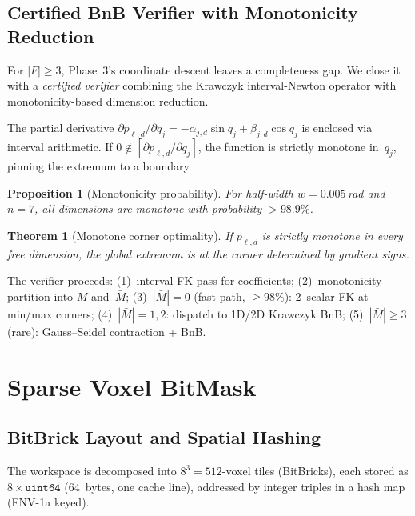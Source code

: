 \documentclass[journal]{IEEEtran}
\newtheorem{theorem}{Theorem}
\newtheorem{proposition}{Proposition}
\begin{document}
\subsection{Certified BnB Verifier with Monotonicity Reduction}%
\label{sec:certified_verifier}

For $|F|\geq 3$, Phase~3's coordinate descent leaves a completeness gap.
We close it with a \emph{certified verifier} combining the Krawczyk
interval-Newton operator with monotonicity-based dimension reduction.

The partial derivative
$\partial p_{\ell,d}/\partial q_j = -\alpha_{j,d}\sin q_j + \beta_{j,d}\cos q_j$
is enclosed via interval arithmetic.
If $0 \notin [\partial p_{\ell,d}/\partial q_j]$, the function is
strictly monotone in~$q_j$, pinning the extremum to a boundary.

\begin{proposition}[Monotonicity probability]\label{prop:mono_prob}
For half-width $w = 0.005\,$rad and $n = 7$, all dimensions are
monotone with probability $> 98.9\%$.
\end{proposition}

\begin{theorem}[Monotone corner optimality]\label{thm:mono_corner}
If $p_{\ell,d}$ is strictly monotone in every free dimension, the
global extremum is at the corner determined by gradient signs.
\end{theorem}

The verifier proceeds: (1)~interval-FK pass for coefficients;
(2)~monotonicity partition into $M$ and~$\bar{M}$;
(3)~$|\bar{M}|=0$ (fast path, $\geq 98\%$): 2~scalar FK at
min/max corners;
(4)~$|\bar{M}|=1,2$: dispatch to 1D/2D Krawczyk BnB;
(5)~$|\bar{M}|\geq 3$ (rare): Gauss--Seidel contraction + BnB.

\section{Sparse Voxel BitMask}\label{sec:voxel}

\subsection{BitBrick Layout and Spatial Hashing}\label{sec:bitbrick}

The workspace is decomposed into $8^3=512$-voxel tiles (BitBricks),
each stored as $8 \times \texttt{uint64}$ (64~bytes, one cache line),
addressed by integer triples in a hash map (FNV-1a keyed).
\end{document}
